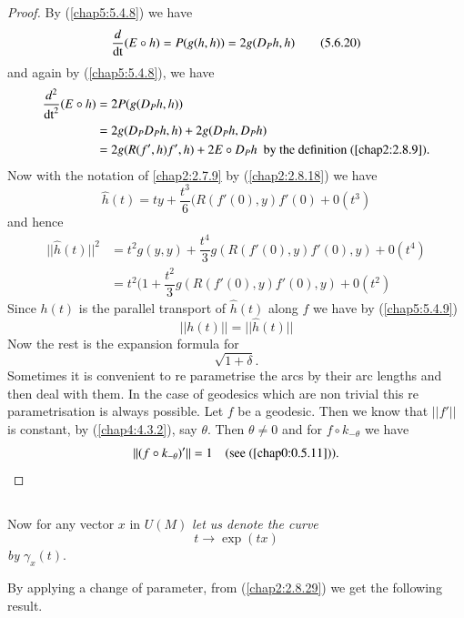 \begin{proof}
By (\ref{chap5:5.4.8}) we have
\begin{equation*}
\dfrac{d}{\operatorname{dt}}(E\circ h)=P(g(h,h))=2g(D_{P}h,h)\tag{5.6.20}\label{chap5:5.6.20}
\end{equation*}
and again by (\ref{chap5:5.4.8}), we have
\begin{align*}
\dfrac{d^{2}}{\operatorname{dt}^{2}}(E\circ h) &= 2P(g(D_{P}h,h))\\
&= 2g(D_{P}D_{P}h,h)+2g(D_{P}h, D_{P}h)\\
&= 2g(R(f',h)f',h)+2E\circ D_{P}h\text{ \  by the definition (\ref{chap2:2.8.9})}.
\end{align*}
Now \pageoriginale with the notation of \eqref{chap2:2.7.9} by
(\ref{chap2:2.8.18}) we have
\begin{equation*}
\widehat{h}(t)=ty+\dfrac{t^{3}}{6}(R(f'(0),y)f'(0)+0(t^{3})\tag{5.6.21}\label{chap5:5.6.21}
\end{equation*}
and hence
\begin{align*}
||\widehat{h}(t)||^{2} &=
t^{2}g(y,y)+\dfrac{t^{4}}{3}g(R(f'(0),y)f'(0),y)+0(t^{4})\\
&= t^{2}\big(1+\dfrac{t^{2}}{3}g(R(f'(0),y)f'(0),y)+0(t^{2})
\end{align*}
Since $h(t)$ is the parallel transport of $\widehat{h}(t)$ along $f$
we have by (\ref{chap5:5.4.9})
$$
||h(t)||=||\widehat{h}(t)||
$$
Now the rest is the expansion formula for
$$
\sqrt{1+\delta}.
$$
Sometimes it is convenient to re parametrise the arcs by their arc
lengths and then deal with them. In the case of geodesics which are
non trivial this re parametrisation is always possible. Let $f$ be a
geodesic. Then we know that $||f'||$ is constant, by
(\ref{chap4:4.3.2}), say $\theta$. Then $\theta\neq 0$ and for $f\circ
k_{-\theta}$ we have
$$
||(f\circ k_{-\theta})'||=1\quad\text{(see (\ref{chap0:0.5.11})).}
$$
\end{proof}

\setcounter{subsection}{21}
\subsection{}\label{chap5:5.6.22}
Now for any vector $x$ in $U(M)$ {\em let us denote the curve}
$$
t\to \exp(tx)
$$
{\em by} $\gamma_{x}(t)$.

By applying a change of parameter, from (\ref{chap2:2.8.29}) we get the
following result.

\subsection{}\label{chap5:5.6.23}

